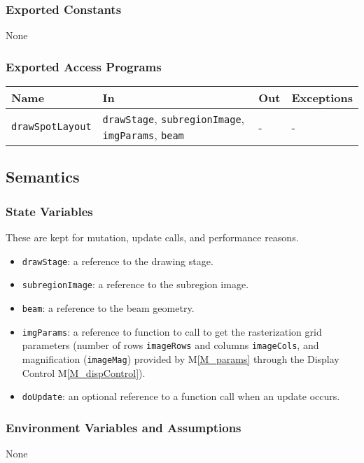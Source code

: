 \documentclass[12pt, titlepage]{article}
\newcommand{\mref}[1]{M\ref{#1}}
\newcommand{\code}[1]{\texttt{#1}}
\begin{document}
\subsubsection{Exported Constants}
None
\subsubsection{Exported Access Programs}

\begin{center}
\begin{tabular}{p{4cm} p{4cm} p{4cm} p{2cm}}
\hline
\textbf{Name} & \textbf{In} & \textbf{Out} & \textbf{Exceptions} \\
\hline
\code{drawSpotLayout} & \code{drawStage}, \code{subregionImage}, \code{imgParams}, \code{beam}
  & - & - \\
\hline
\end{tabular}
\end{center}

\subsection{Semantics}

\subsubsection{State Variables}
These are kept for mutation, update calls, and performance reasons.
\begin{itemize}
  \item \code{drawStage}: a reference to the drawing stage.
  \item \code{subregionImage}: a reference to the subregion image.
  \item \code{beam}: a reference to the beam geometry.
  \item \code{imgParams}: a reference to function to call to get the rasterization
    grid parameters (number of rows \code{imageRows} and columns \code{imageCols},
    and magnification (\code{imageMag}) 
    provided by \mref{M_params}
    through the Display Control \mref{M_dispControl}).
  \item \code{doUpdate}: an optional reference to a function call when an update occurs.
\end{itemize}

\subsubsection{Environment Variables and Assumptions}
None
\end{document}
